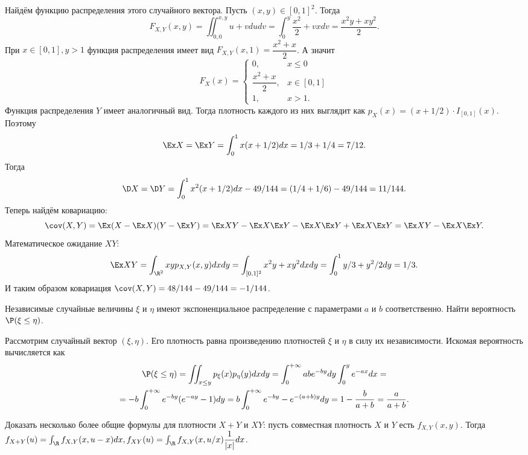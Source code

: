 \begin{solution}
    Найдём функцию распределения этого случайного вектора.
    Пусть $(x, y) \in [0, 1]^2$.
    Тогда
    \[
        F_{X, Y}(x, y) = \iint_{0, 0}^{x, y} u + v dudv = \int_0^y \dfrac{x^2}{2} + vxdv = \dfrac{x^2y + xy^2}{2}.
    \]
    При $x \in [0, 1], y > 1$ функция распределения имеет вид $F_{X, Y}(x, 1) = \dfrac{x^2 + x}{2}$.
    А значит
    \[  F_X(x) =
        \begin{cases}
            0, & x \leq 0 \\
            \dfrac{x^2 + x}{2}, & x \in [0, 1] \\
            1, & x > 1.
        \end{cases}
    \]
    Функция распределения $Y$ имеет аналогичный вид.
    Тогда плотность каждого из них выглядит как $p_X(x) = (x + 1/2) \cdot I_{[0, 1]}(x)$.
    Поэтому
    \[
        \Ex X = \Ex Y = \int_0^1 x(x + 1/2)dx = 1/3 + 1/4 = 7/12.
    \]
    Тогда
    \[
        \D X = \D Y = \int_0^1 x^2(x + 1/2)dx - 49/144 = (1/4 + 1/6) - 49/144 = 11/144.
    \]
    Теперь найдём ковариацию:
    \[
        \cov(X, Y) = \Ex (X - \Ex X)(Y - \Ex Y) = \Ex XY - \Ex X \Ex Y - \Ex X \Ex Y + \Ex X \Ex Y = \Ex XY - \Ex X \Ex Y.
    \]
    Математическое ожидание $XY$:
    \[
        \Ex XY = \int_{\R^2} xyp_{X, Y}(x, y)dxdy = \int_{[0, 1]^2} x^2 y + xy^2 dx dy = \int_0^1 y/3 + y^2/2dy = 1/3.
    \]
    И таким образом ковариация $\cov(X, Y) = 48/144 - 49/144 = -1/144$.
\end{solution}
\begin{problem}
    Независимые случайные величины $\xi$ и $\eta$ имеют экспоненциальное распределение с параметрами $a$ и $b$ соответственно.
    Найти вероятность $\P(\xi \leq \eta)$.
\end{problem}
\begin{solution}
    Рассмотрим случайный вектор $(\xi, \eta)$.
    Его плотность равна произведению плотностей $\xi$ и $\eta$ в силу их независимости.
    Искомая вероятность вычисляется как
    \begin{multline*}
        \P(\xi \leq \eta) = \iint_{{x \leq y}}p_{\xi}(x)p_{\eta}(y)dxdy = \int_0^{+\infty} abe^{-by}dy\int_0^y e^{-ax}dx = \\
        = -b\int_0^{+\infty}e^{-by}(e^{-ay} - 1)dy = b \int_0^{+\infty} e^{-by} - e^{-(a + b)y}dy = 1 - \dfrac{b}{a + b} = \dfrac{a}{a + b}.
    \end{multline*}
\end{solution}
\begin{problem}
    Доказать несколько более общие формулы для плотности $X + Y$ и $XY$: пусть совместная плотность $X$ и $Y$ есть $f_{X, Y}(x, y)$.
    Тогда $f_{X + Y}(u) = \int_\R f_{X, Y}(x, u - x)dx, f_{XY}(u) = \int_\R f_{X, Y}(x, u/x)\dfrac{1}{|x|}dx$.
\end{problem}

